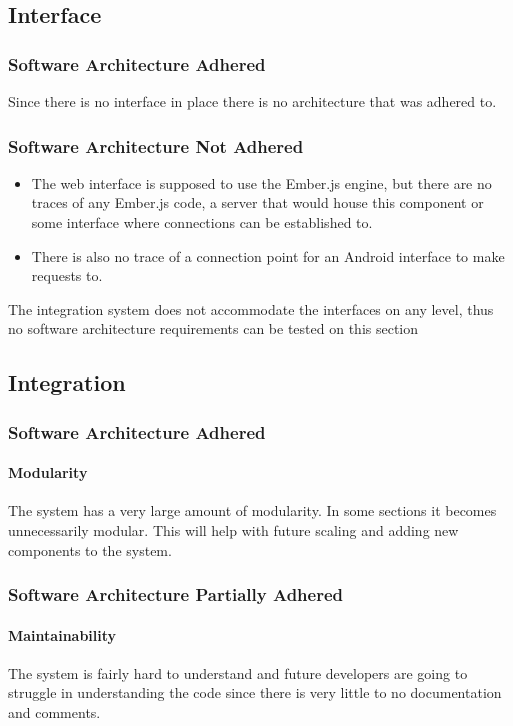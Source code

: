 \documentclass{article}
\begin{document}
	\subsection{Interface}
		\subsubsection{Software Architecture Adhered}
			Since there is no interface in place there is no architecture that was adhered to.
		\subsubsection{Software Architecture Not Adhered}
			\begin{itemize}	
				\item The web interface is supposed to use the Ember.js engine, but there are no traces of any Ember.js code, a server that would house this component or some interface where connections can be established to.
				\item There is also no trace of a connection point for an Android interface to make requests to.
			\end{itemize}
			The integration system does not accommodate the interfaces on any level, thus no software architecture requirements can be tested on this section

	\subsection{Integration}
		\subsubsection{Software Architecture Adhered}
			\paragraph{Modularity} The system has a very large amount of modularity. In some sections it becomes unnecessarily modular. This will help with future scaling and adding new components to the system.
			
		\subsubsection{Software Architecture Partially Adhered}
			\paragraph{Maintainability} The system is fairly hard to understand and future developers are going to struggle in understanding the code since there is very little to no documentation and comments.
\end{document}
